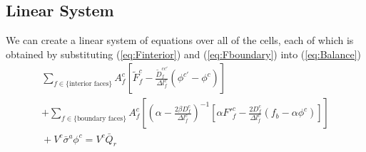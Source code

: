 \documentclass{article}
\newcommand{\bfunc}{\ensuremath{f_{b}}}
\begin{document}
\subsection{Linear System}

We can create a linear system of equations over all of the cells, each of 
which is obtained by substituting (\ref{eq:Finterior}) and (\ref{eq:Fboundary})
into (\ref{eq:Balance})
\begin{multline}
        \sum_{f \in \{\text{interior faces}\}}
        A^{c}_{f} \left[
           \tilde{F}^{c}_{f} -  \frac{\tilde{D}^{cc'}_{f}}{\Delta l^{c}_{f}}
                                \left( \phi^{c'} - \phi^{c} \right)
        \right]
   \\
   +
        \sum_{f \in \{\text{boundary faces}\}}
        A^{c}_{f} \left[
                    \left( \alpha - \frac{2 \beta D^{c}_{f}}{\Delta l^{c}_{f}}
                    \right)^{-1}
                    \left[ \alpha {F'}^{c}_{f} - \frac{2 D^{c}_{f}}{\Delta l^{c}_{f}}
                                                \left(\bfunc - \alpha \phi^{c}\right)
                    \right]
        \right]
   \\
   \mbox{} +
         V^{c} \bar{\sigma}^{a} \phi^{c}
                = V^{c} \bar{Q}_{r}
\end{multline}
\end{document}
